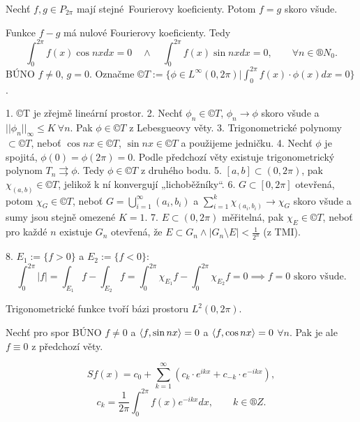 \documentclass[12pt]{article}					%
\begin{document}
	\begin{veta}
		Nechť $f, g \in P_{2\pi}$ mají stejné Fourierovy koeficienty. Potom $f = g$ skoro všude.

		\begin{dukazin}
			Funkce $f - g$ má nulové Fourierovy koeficienty. Tedy
			$$ \int_0^{2 \pi} f(x) \cos n x dx = 0 \quad \land \quad \int_0^{2\pi} f(x) \sin n x dx = 0, \qquad \forall n \in ®N_0. $$
			BÚNO $f ≠ 0$, $g = 0$. Označme $©T := \{\phi \in L^∞ (0, 2\pi) | \int_0^{2\pi} f(x) · \phi(x) dx = 0\}$.

			1. ©T je zřejmě lineární prostor. 2. Nechť $\phi_n \in ©T$, $\phi_n \rightarrow \phi$ skoro všude a $||\phi_n||_∞ ≤ K\ \forall n$. Pak $\phi \in ©T$ z Lebesgueovy věty. 3. Trigonometrické polynomy $\subset ©T$, neboť $\cos n x \in ©T$, $\sin n x \in ©T$ a použijeme jedničku. 4. Nechť $\phi$ je spojitá, $\phi(0) = \phi(2\pi) = 0$. Podle předchozí věty existuje trigonometrický polynom $T_n \rightrightarrows \phi$. Tedy $\phi \in ©T$ z druhého bodu. 5. $[a, b] \subset (0, 2\pi)$, pak $\chi_{(a, b)} \in ©T$, jelikož k ní konvergují „lichoběžníky“. 6. $G \subset [0, 2\pi]$ otevřená, potom $\chi_G \in ©T$, neboť $G = \bigcup_{i=1}^∞ (a_i, b_i)$ a $\sum_{i=1}^k \chi_{(a_i, b_i)} \rightarrow \chi_G$ skoro všude a sumy jsou stejně omezené $K = 1$. 7. $E \subset (0, 2\pi)$ měřitelná, pak $\chi_E \in ©T$, neboť pro každé $n$ existuje $G_n$ otevřená, že $E \subset G_n \land |G_n \setminus E| < \frac{1}{2^n}$ (z TMI).

			8. $E_1 := \{f > 0\}$ a $E_2 := \{f < 0\}$:
			$$ \int_0^{2 \pi} |f| = \int_{E_1} f - \int_{E_2} f = \int_0^{2\pi} \chi_{E_1} f - \int_0^{2\pi} \chi_{E_2} f = 0 \implies f = 0 \text{ skoro všude}. $$
		\end{dukazin}
	\end{veta}

	\begin{dusledek}
		Trigonometrické funkce tvoří bázi prostoru $L^2(0, 2\pi)$.

		\begin{dukazin}
			Nechť pro spor BÚNO $f ≠ 0$ a $\left\langle f, \sin n x\right\rangle = 0$ a $\left\langle f, \cos n x\right\rangle = 0$ $\forall n$. Pak je ale $f ≡ 0$ z předchozí věty.
		\end{dukazin}
	\end{dusledek}

	\begin{poznamka}
		$$ S f(x) = c_0 + \sum_{k=1}^∞ (c_k ·e^{i k x} + c_{-k}·e^{-i k x}), $$
		$$ c_k = \frac{1}{2\pi} \int_0^{2\pi} f(x) e^{-i k x} dx, \qquad k \in ®Z. $$
	\end{poznamka}
\end{document}
